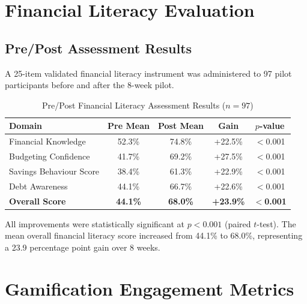 \documentclass[12pt,a4paper]{report}
\begin{document}
\section{Financial Literacy Evaluation}

\subsection{Pre/Post Assessment Results}

A 25-item validated financial literacy instrument was administered to 97 pilot
participants before and after the 8-week pilot.

\begin{table}[H]
\centering
\caption{Pre/Post Financial Literacy Assessment Results ($n = 97$)}
\label{tab:literacy_results}
\begin{tabular}{lcccc}
\toprule
\textbf{Domain} & \textbf{Pre Mean} & \textbf{Post Mean} & \textbf{Gain} & \textbf{$p$-value} \\
\midrule
Financial Knowledge     & 52.3\% & 74.8\% & +22.5\% & $<$0.001 \\
Budgeting Confidence    & 41.7\% & 69.2\% & +27.5\% & $<$0.001 \\
Savings Behaviour Score & 38.4\% & 61.3\% & +22.9\% & $<$0.001 \\
Debt Awareness          & 44.1\% & 66.7\% & +22.6\% & $<$0.001 \\
\midrule
\textbf{Overall Score}  & \textbf{44.1\%} & \textbf{68.0\%} & \textbf{+23.9\%} & $<$\textbf{0.001} \\
\bottomrule
\end{tabular}
\end{table}

All improvements were statistically significant at $p < 0.001$ (paired $t$-test). The
mean overall financial literacy score increased from 44.1\% to 68.0\%, representing a
23.9 percentage point gain over 8 weeks.

\section{Gamification Engagement Metrics}
\end{document}
